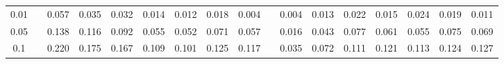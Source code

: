 % 
\begin{tabular}{ccccccccccccccccc}
  \hline
  \hline
0.01 &  & 0.057 & 0.035 & 0.032 & 0.014 & 0.012 & 0.018 & 0.004 &  & 0.004 & 0.013 & 0.022 & 0.015 & 0.024 & 0.019 & 0.011 \\ 
  0.05 &  & 0.138 & 0.116 & 0.092 & 0.055 & 0.052 & 0.071 & 0.057 &  & 0.016 & 0.043 & 0.077 & 0.061 & 0.055 & 0.075 & 0.069 \\ 
  0.1 &  & 0.220 & 0.175 & 0.167 & 0.109 & 0.101 & 0.125 & 0.117 &  & 0.035 & 0.072 & 0.111 & 0.121 & 0.113 & 0.124 & 0.127 \\ 
   \hline
\end{tabular}
